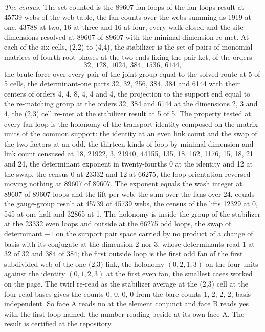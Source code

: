 \begin{chproof}[census]
\textit{The census.} The set counted is the 89607 fan loops of the fan-loops result at 45739 webs of the web table, the fan counts over the webs summing as 1919 at one, 43788 at two, 16 at three and 16 at four, every walk closed and the site dimensions resolved at 89607 of 89607 with the minimal dimension re-met. At each of the six cells, (2,2) to (4,4), the stabilizer is the set of pairs of monomial matrices of fourth-root phases at the two ends fixing the pair ket, of the orders
\begin{equation}
32,\ 128,\ 1024,\ 384,\ 1536,\ 6144,
\end{equation}
the brute force over every pair of the joint group equal to the solved route at 5 of 5 cells, the determinant-one parts 32, 32, 256, 384, 384 and 6144 with their centers of orders 4, 4, 8, 4, 4 and 4, the projection to the support end equal to the re-matching group at the orders 32, 384 and 6144 at the dimensions 2, 3 and 4, the (2,3) cell re-met at the stabilizer result at 5 of 5. The property tested at every fan loop is the holonomy of the transport identity composed on the matrix units of the common support: the identity at an even link count and the swap of the two factors at an odd, the thirteen kinds of loop by minimal dimension and link count censused at 18, 21922, 3, 21940, 44155, 135, 18, 162, 1176, 15, 18, 21 and 24, the determinant exponent in twenty-fourths 0 at the identity and 12 at the swap, the census 0 at 23332 and 12 at 66275, the loop orientation reversed moving nothing at 89607 of 89607. The exponent equals the wash integer at 89607 of 89607 loops and the lift per web, the sum over the fans over 24, equals the gauge-group result at 45739 of 45739 webs, the census of the lifts 12329 at 0, 545 at one half and 32865 at 1. The holonomy is inside the group of the stabilizer at the 23332 even loops and outside at the 66275 odd loops, the swap of determinant $-1$ on the support pair space carried by no product of a change of basis with its conjugate at the dimension 2 nor 3, whose determinants read 1 at 32 of 32 and 384 of 384; the first outside loop is the first odd fan of the first subdivided web of the one (2,3) link, the holonomy $(0, 2, 1, 3)$ on the four units against the identity $(0, 1, 2, 3)$ at the first even fan, the smallest cases worked on the page. The twirl re-read as the stabilizer average at the (2,3) cell at the four read bases gives the counts 0, 0, 0, 0 from the bare counts 1, 2, 2, 2, basis-independent. So face A reads no at the element conjunct and face B reads yes with the first loop named, the number reading beside at its own face A. The result is certified at the repository.


\end{chproof}
